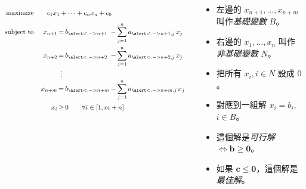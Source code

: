 \documentclass[standalone]{beamer}
\begin{document}
\begin{frame}{}
  \begin{columns}[t]
    \[
      \scalebox{0.8}{$
      \linearprog{c_1 x_1 + \dots + c_n x_n + c_0}{
        \arraycolsep=1pt
        \begin{array}[t]{rc>{\displaystyle}lc>{\displaystyle}l}
          x_{n+1} & = & b_{\alert<.->{n+1}} &-& \sum_{j=1}^n a_{\alert<.->{n+1}, j} \, x_j \\[15pt]
          x_{n+2} & = & b_{\alert<.->{n+2}} &-& \sum_{j=1}^n a_{\alert<.->{n+2}, j} \, x_j \\
          & \vdots &      & &                      \\
          x_{n+m} & = & b_{\alert<.->{n+m}} &-& \sum_{j=1}^n a_{\alert<.->{n+m}, j} \, x_j \\[15pt]
          x_i & \geq & \multicolumn{3}{l}{0 \quad\quad \forall i \in [1, m+n]} \\
        \end{array}
      }$}
    \]
    \pause
    
    \begin{centering}
      \begin{itemize}[<+->]
        \itemsep=0.5ex
        \item 左邊的 $x_{n+1}, \dots, x_{n+m}$ 叫作\emph{基礎變數} $B$。
        \item 右邊的 $x_{1}, \dots, x_{n}$ 叫作\emph{非基礎變數} $N$。
        \item 把所有 $x_i, i \in N$ 設成 $0$。
        \item 對應到一組解 $x_i = b_i$, $i \in B$。
        \item 這個解是\emph{可行解} $\iff \bm{b} \geq \bm{0}$。
        \item 如果 $\bm{c} \leq \bm{0}$，這個解是\emph{最佳解}。
      \end{itemize}
    \end{centering}
  \end{columns}
\end{frame}
\end{document}
